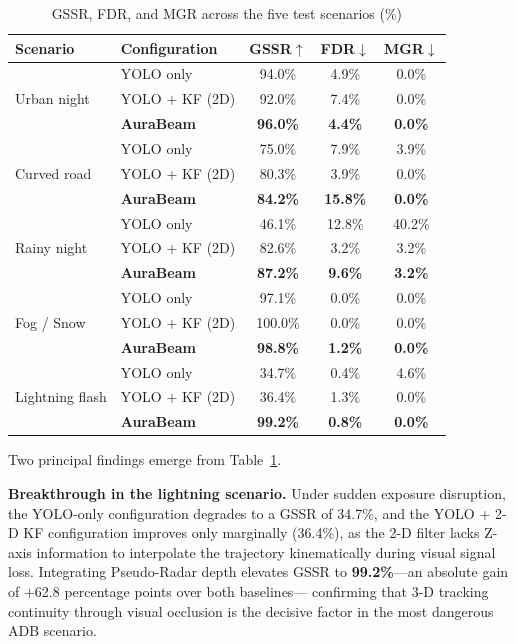 \documentclass[pdflatex,sn-mathphys-num]{sn-jnl}%
\theoremstyle{thmstyleone}%
\theoremstyle{thmstyletwo}%
\theoremstyle{thmstylethree}%
\begin{document}
\begin{table}[t]
\centering
\caption{GSSR, FDR, and MGR across the five test scenarios (\%)}
\label{tab:gssr}
%
\begin{tabular}{llccc}
\hline
\textbf{Scenario} & \textbf{Configuration}
  & \textbf{GSSR}$\uparrow$ & \textbf{FDR}$\downarrow$
  & \textbf{MGR}$\downarrow$ \\
\hline
\multirow{3}{*}{Urban night}
  & YOLO only         & 94.0\% &  4.9\% & 0.0\% \\
  & YOLO + KF (2D)    & 92.0\% &  7.4\% & 0.0\% \\
  & \textbf{AuraBeam} & \textbf{96.0\%} & \textbf{4.4\%}
                      & \textbf{0.0\%} \\
\hline
\multirow{3}{*}{Curved road}
  & YOLO only         & 75.0\%  &  7.9\% & 3.9\% \\
  & YOLO + KF (2D)    & 80.3\%  &  3.9\% & 0.0\% \\
  & \textbf{AuraBeam} & \textbf{84.2\%} & \textbf{15.8\%}
                      & \textbf{0.0\%} \\
\hline
\multirow{3}{*}{Rainy night}
  & YOLO only         & 46.1\%  & 12.8\% & 40.2\% \\
  & YOLO + KF (2D)    & 82.6\%  &  3.2\% &  3.2\% \\
  & \textbf{AuraBeam} & \textbf{87.2\%} & \textbf{9.6\%}
                      & \textbf{3.2\%} \\
\hline
\multirow{3}{*}{Fog / Snow}
  & YOLO only         & 97.1\%  & 0.0\% & 0.0\% \\
  & YOLO + KF (2D)    & 100.0\% & 0.0\% & 0.0\% \\
  & \textbf{AuraBeam} & \textbf{98.8\%} & \textbf{1.2\%}
                      & \textbf{0.0\%} \\
\hline
\multirow{3}{*}{Lightning flash}
  & YOLO only         & 34.7\%  &  0.4\% & 4.6\% \\
  & YOLO + KF (2D)    & 36.4\%  &  1.3\% & 0.0\% \\
  & \textbf{AuraBeam} & \textbf{99.2\%} & \textbf{0.8\%}
                      & \textbf{0.0\%} \\
\hline
\end{tabular}%
\end{table}

Two principal findings emerge from Table~\ref{tab:gssr}.

\textbf{Breakthrough in the lightning scenario.} Under sudden
exposure disruption, the YOLO-only configuration degrades to a GSSR
of 34.7\%, and the YOLO + 2-D KF configuration improves only
marginally (36.4\%), as the 2-D filter lacks Z-axis information to
interpolate the trajectory kinematically during visual signal loss.
Integrating Pseudo-Radar depth elevates GSSR to \textbf{99.2\%}---an
absolute gain of $+$62.8 percentage points over both baselines---
confirming that 3-D tracking continuity through visual occlusion is
the decisive factor in the most dangerous ADB scenario.
\end{document}
